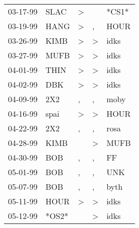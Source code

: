 \begin{supertabular}{p{0.07\textwidth}p{0.06\textwidth}p{0.02\textwidth}p{0.02\textwidth}p{0.06\textwidth}}
 03-17-99\textsuperscript{} &           SLAC\textsuperscript{} &     \textgreater &               &                            *CS1* \\
 03-19-99\textsuperscript{} &           HANG\textsuperscript{} &     \textgreater &             , &           HOUR\textsuperscript{} \\
 03-26-99\textsuperscript{} &           KIMB\textsuperscript{} &     \textgreater &  \textgreater &           idks\textsuperscript{} \\
 03-27-99\textsuperscript{} &           MUFB\textsuperscript{} &     \textgreater &  \textgreater &           idks\textsuperscript{} \\
 04-01-99\textsuperscript{} &           THIN\textsuperscript{} &     \textgreater &  \textgreater &           idks\textsuperscript{} \\
 04-02-99\textsuperscript{} &            DBK\textsuperscript{} &     \textgreater &  \textgreater &           idks\textsuperscript{} \\
 04-09-99\textsuperscript{} &            2X2\textsuperscript{} &                , &             , &           moby\textsuperscript{} \\
 04-16-99\textsuperscript{} &           spai\textsuperscript{} &     \textgreater &  \textgreater &           HOUR\textsuperscript{} \\
 04-22-99\textsuperscript{} &            2X2\textsuperscript{} &                , &             , &           rosa\textsuperscript{} \\
 04-28-99\textsuperscript{} &           KIMB\textsuperscript{} &                  &  \textgreater &           MUFB\textsuperscript{} \\
 04-30-99\textsuperscript{} &            BOB\textsuperscript{} &                , &             , &             FF\textsuperscript{} \\
 05-01-99\textsuperscript{} &            BOB\textsuperscript{} &                , &             , &            UNK\textsuperscript{} \\
 05-07-99\textsuperscript{} &            BOB\textsuperscript{} &                , &             , &           byth\textsuperscript{} \\
 05-11-99\textsuperscript{} &           HOUR\textsuperscript{} &     \textgreater &  \textgreater &           idks\textsuperscript{} \\
 05-12-99\textsuperscript{} &                            *OS2* &                  &  \textgreater &           idks\textsuperscript{} \\

\end{supertabular}
